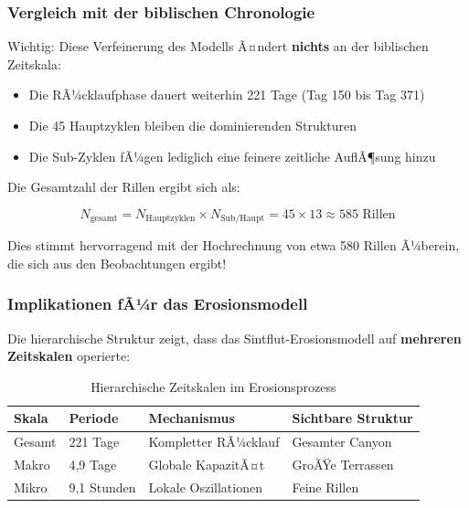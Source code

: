 \subsubsection{Vergleich mit der biblischen Chronologie}

Wichtig: Diese Verfeinerung des Modells Ã¤ndert \textbf{nichts} an der biblischen Zeitskala:

\begin{itemize}
	\item Die RÃ¼cklaufphase dauert weiterhin 221 Tage (Tag 150 bis Tag 371)
	\item Die 45 Hauptzyklen bleiben die dominierenden Strukturen
	\item Die Sub-Zyklen fÃ¼gen lediglich eine feinere zeitliche AuflÃ¶sung hinzu
\end{itemize}

Die Gesamtzahl der Rillen ergibt sich als:

\begin{equation}
	N_{\text{gesamt}} = N_{\text{Hauptzyklen}} \times N_{\text{Sub/Haupt}} = 45 \times 13 \approx 585 \text{ Rillen}
\end{equation}

Dies stimmt hervorragend mit der Hochrechnung von etwa 580 Rillen Ã¼berein, die sich aus den Beobachtungen ergibt!

\subsubsection{Implikationen fÃ¼r das Erosionsmodell}

Die hierarchische Struktur zeigt, dass das Sintflut-Erosionsmodell auf \textbf{mehreren Zeitskalen} operierte:

\begin{table}[h]
	\centering
	\begin{tabular}{|l|l|l|l|}
		\hline
		\textbf{Skala} & \textbf{Periode} & \textbf{Mechanismus} & \textbf{Sichtbare Struktur} \\
		\hline
		Gesamt & 221 Tage & Kompletter RÃ¼cklauf & Gesamter Canyon \\
		\hline
		Makro & 4,9 Tage & Globale KapazitÃ¤t & GroÃŸe Terrassen \\
		\hline
		Mikro & 9,1 Stunden & Lokale Oszillationen & Feine Rillen \\
		\hline
	\end{tabular}
	\caption{Hierarchische Zeitskalen im Erosionsprozess}
\end{table}

